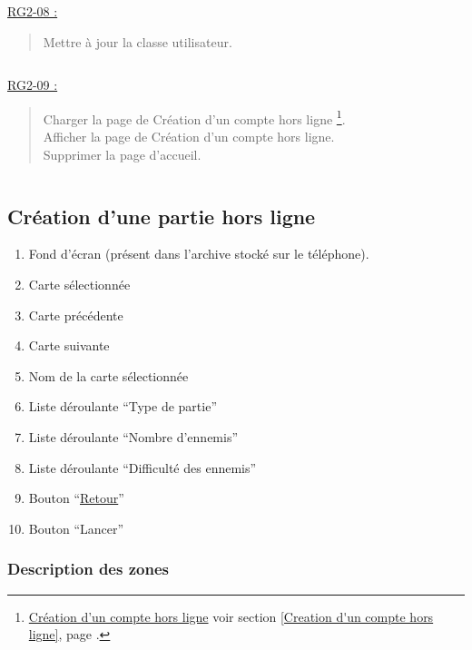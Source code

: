 \documentclass{report}
\begin{document}
		\underline{RG2-08 :}
			\begin{quote}
				Mettre à jour la classe utilisateur.
			\end{quote}

		$\,$

		\underline{RG2-09 :}
			\begin{quote}
				Charger la page de Création d'un compte hors ligne%
					\footnote{
						\hyperlink{profil}{Création d'un compte hors ligne}
						\og voir section \ref{Creation d'un compte hors ligne}, page \pageref{Creation d'un compte hors ligne}.\fg
					}.\\
				Afficher la page de Création d'un compte hors ligne\footnotemark[9].\\
				Supprimer la page d'accueil\footnotemark[2].
			\end{quote}

		$\,$
	
\newpage

	\subsection{Création d'une partie hors ligne}
	
		\hypertarget{Creer partie solo}{}
		\label{Creer partie solo}

		\begin{center}
					
		\end{center}
		
		\begin{enumerate}
		  \item Fond d'écran (présent dans l'archive stocké sur le téléphone).
		  \item Carte sélectionnée
		  \item Carte précédente
		  \item Carte suivante
		  \item Nom de la carte sélectionnée
		  \item Liste déroulante ``Type de partie''
		  \item Liste déroulante ``Nombre d'ennemis''
		  \item Liste déroulante ``Difficulté des ennemis''
		  \item Bouton ``\hyperlink{Accueil}{Retour}''
		  \item Bouton ``Lancer'' 
		\end{enumerate}
		
		\subsubsection{Description des zones}
		
\end{document}
